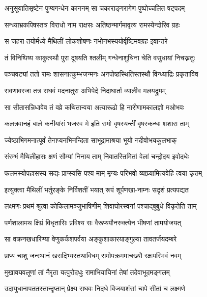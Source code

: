 \twolineshloka
{अनुसूयातिसृष्टेन पुण्यगन्धेन काननम्}
{सा चकाराङ्गरागेण पुष्पोच्चलित षट्पदम्} %

\twolineshloka
{सन्ध्याभ्रकपिषस्तत्र विराधो नाम राक्षसः}
{अतिष्ठन्मार्गमावृत्य रामस्येन्दोरिव ग्रहः} %

\twolineshloka
{स जहरा तयोर्मध्ये मैथिलीं लोकशोषणः}
{नभोनभस्ययोर्वृष्टिमवग्रह इवान्तरे} %

\twolineshloka
{तं विनिष्पिष्य काकुत्स्थौ पुरा दूषयति श्तलीम्}
{गन्धेनाशुचिना चेति वसुधायां निचख्नतुः} %

\twolineshloka
{पञ्चवट्यां ततो रामः शासनात्कुम्भजन्मनः}
{अनपोष्हस्थितिस्तस्थौ विन्ध्याद्रिः प्रकृताविव} %

\twolineshloka
{रावणावरजा तत्र राघवं मदनातुरा}
{अभिपेदे निदाघार्ता व्यालीव मलयद्रुमम्} %

\twolineshloka
{सा सीतासन्निधावेव तं वव्रे कथितान्वया}
{अत्यारूढो हि नारीणामकालज्ञो मओभवः} %

\twolineshloka
{कलत्रवानहं बाले कनीयांसं भजस्व मे}
{इति रामो वृषस्यन्तीं वृषस्कन्धः शशास ताम्} %

\twolineshloka
{ज्येष्ठाभिगमनात्पूर्वं तेनाप्यनभिनन्दिता}
{साभूद्रामाश्रया भूयो नदीवोभयकूलभाक्} %

\twolineshloka
{संरम्भं मैथिलीहासः क्षणं सौम्यां निनाय ताम्}
{निवातस्तिमितां वेलां चन्द्रोदय इवोदधेः} %

\twolineshloka
{फलमस्योपहासस्य सद्यः प्राप्स्यसि पश्य माम्}
{मृग्यः परिभवो व्याघ्र्यामित्यवेहि त्वया कृतम्} %

\twolineshloka
{इत्युक्त्वा मैथिलीं भर्तुरङ्के निर्विशतीं भयात्}
{रूपं शूर्पणखा-नाम्नः सदृशं प्रत्यपद्यत} %

\twolineshloka
{लक्ष्मणः प्रथमं श्रुत्वा कोकिलामञ्जुभाषिणीम्}
{शिवाघोरस्वनां पश्चाद्बुबुधे विकृतेति ताम्} %

\twolineshloka
{पर्णशालामथ क्षिप्रं विधृतासिः प्रविश्य सः}
{वैरूप्यपौनरुक्त्येन भीषणां तामयोजयत्} %

\twolineshloka
{सा वक्रनखधारिण्या वेणुकर्कशपर्वया}
{अङ्कुशाकारयाङ्गुल्या तावतर्जयदम्बरे} %

\twolineshloka
{प्राप्य चाशु जन्स्थानं खरादिभ्यस्तथाविधम्}
{रामोपक्रममाचख्यौ रक्षःपरिभवं नवम्} %

\twolineshloka
{मुखावयवलूणां तां नैरृता यत्पुरोदधुः}
{रामाभियायिनां तेषां तदेवाभूदमङ्गलम्} %

\twolineshloka
{उदायुधानापततस्तान्दृप्तान् प्रेक्ष्य राघवः}
{निदधे विजयाशंसां चापे सीतां च लक्ष्मणे} %

